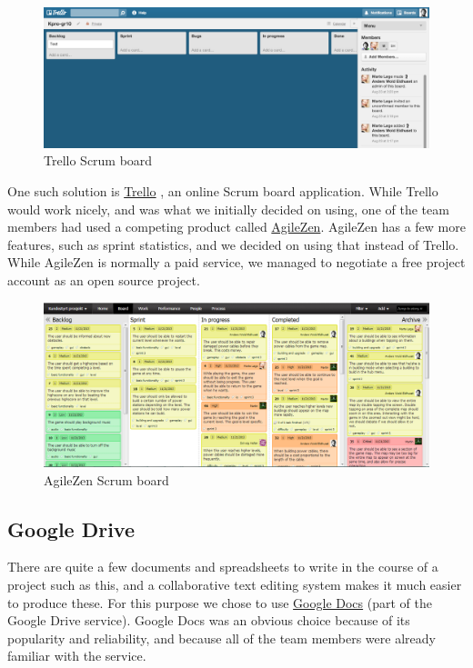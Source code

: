     \begin{figure}[htb]
      \centering
      \includegraphics[width=1\textwidth]{pictures/trello.png}
      \caption{Trello Scrum board}
    \end{figure}

    One such solution is \href{https://trello.com}{Trello} \cite{trello}, an online Scrum
    board application. While Trello would work nicely, and was what we initially
    decided on using, one of the team members had used a competing product called
    \href{http://www.agilezen.com/}{AgileZen}. AgileZen has a few more features,
    such as sprint statistics, and we decided on using that instead of Trello.
    While AgileZen is normally a paid service, we managed to negotiate a free
    project account as an open source project.

    \begin{figure}[htb]
      \centering
      \includegraphics[width=1\textwidth]{pictures/agilezen2.png}
      \caption{AgileZen Scrum board}
    \end{figure}

\subsection{Google Drive}
    There are quite a few documents and spreadsheets to write in the course
    of a project such as this, and a collaborative text editing system
    makes it much easier to produce these. For this purpose we chose to use
    \href{https://drive.google.com}{Google Docs} (part of the Google Drive
    service). Google Docs was an obvious choice because of its popularity and
    reliability, and because all of the team members were already familiar with the
    service. \cite{drive}

